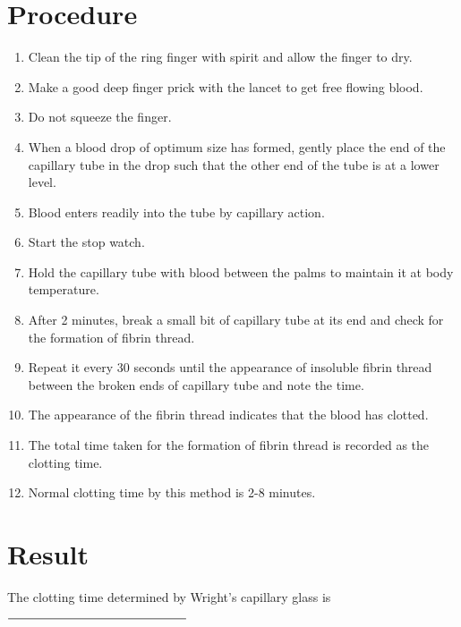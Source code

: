 \documentclass[a4paper,12pt,openany,oneside]{book}
\begin{document}
											\section*{Procedure}
											\begin{enumerate}
												\item{Clean the tip of the ring finger with spirit and allow the finger to dry.}
												\item{Make a good deep finger prick with the lancet to get free flowing blood.}
												\item{Do not squeeze the finger.}
												\item{When a blood drop of optimum size has formed, gently place the end of the capillary tube in the drop such that the other end of the tube is at a lower level.}
												\item{Blood enters readily into the tube by capillary action.}
												\item{Start the stop watch.}
												\item{Hold the capillary tube with blood between the palms to maintain it at body temperature.}
												\item{After 2 minutes, break a small bit of capillary tube at its end and check for the formation of fibrin thread.}
												\item{Repeat it every 30 seconds until the appearance of insoluble fibrin thread between the broken ends of capillary tube and note the time.}
												\item{The appearance of the fibrin thread indicates that the blood has clotted.}
												\item{The total time taken for the formation of fibrin thread is recorded as the clotting time.}
												\item{Normal clotting time by this method is 2-8 minutes.}
											\end{enumerate}
											\section*{Result}

											The clotting time determined by Wright's capillary glass is $\rule{5cm}{0.5pt}$
\end{document}
